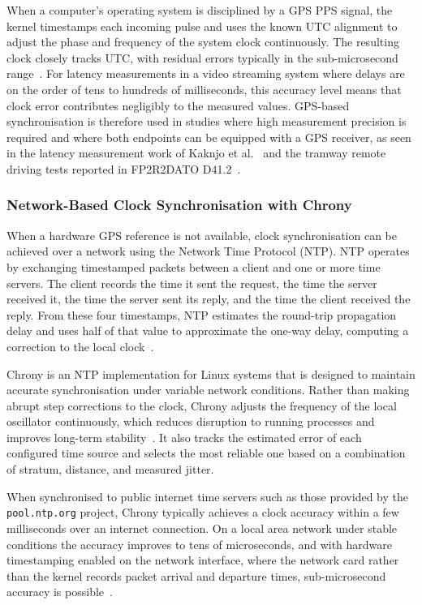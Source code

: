 When a computer's operating system is disciplined by a GPS PPS signal, the kernel timestamps each incoming pulse and uses the known UTC alignment to adjust the phase and frequency of the system clock continuously. The resulting clock closely tracks UTC, with residual errors typically in the sub-microsecond range~\cite{sesia2010}. For latency measurements in a video streaming system where delays are on the order of tens to hundreds of milliseconds, this accuracy level means that clock error contributes negligibly to the measured values. GPS-based synchronisation is therefore used in studies where high measurement precision is required and where both endpoints can be equipped with a GPS receiver, as seen in the latency measurement work of Kaknjo et al.~\cite{kaknjo2018} and the tramway remote driving tests reported in FP2R2DATO D41.2~\cite{fp2r2dato2024d41_2}.

\subsubsection{Network-Based Clock Synchronisation with Chrony}\label{subsubsec:chrony-sync}
When a hardware GPS reference is not available, clock synchronisation can be achieved over a network using the Network Time Protocol (NTP). NTP operates by exchanging timestamped packets between a client and one or more time servers. The client records the time it sent the request, the time the server received it, the time the server sent its reply, and the time the client received the reply. From these four timestamps, NTP estimates the round-trip propagation delay and uses half of that value to approximate the one-way delay, computing a correction to the local clock~\cite{rfc5905}.

Chrony is an NTP implementation for Linux systems that is designed to maintain accurate synchronisation under variable network conditions. Rather than making abrupt step corrections to the clock, Chrony adjusts the frequency of the local oscillator continuously, which reduces disruption to running processes and improves long-term stability~\cite{chronyproject}. It also tracks the estimated error of each configured time source and selects the most reliable one based on a combination of stratum, distance, and measured jitter.

When synchronised to public internet time servers such as those provided by the \texttt{pool.ntp.org} project, Chrony typically achieves a clock accuracy within a few milliseconds over an internet connection. On a local area network under stable conditions the accuracy improves to tens of microseconds, and with hardware timestamping enabled on the network interface, where the network card rather than the kernel records packet arrival and departure times, sub-microsecond accuracy is possible~\cite{redhat2024chrony, redhat2024hw}.

